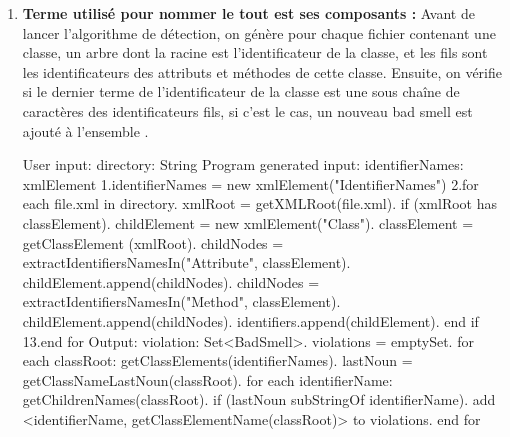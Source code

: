 \begin{enumerate}
\item \textbf {Terme utilisé pour nommer le tout est ses composants :}
Avant de lancer l'algorithme de détection, on génère pour chaque fichier contenant une classe, un arbre dont la racine est l'identificateur de la classe, et les fils sont les identificateurs des attributs et méthodes de cette classe.
Ensuite, on vérifie si le dernier terme de l'identificateur de la classe est une sous chaîne de caractères des identificateurs fils, si c'est le cas, un nouveau bad smell est ajouté à l'ensemble \cite{abebe2009lexicon}.
\begin{framed}
  {\selectfont  
User input:\newline
 directory: String\newline
 Program generated input:\newline
 identifierNames: xmlElement\newline
 1.identifierNames = new xmlElement("IdentifierNames")\newline
 2.for each file.xml in directory.	xmlRoot = getXMLRoot(file.xml).	if (xmlRoot has classElement).		childElement = new xmlElement("Class").             classElement = getClassElement (xmlRoot).		childNodes = extractIdentifiersNamesIn("Attribute", classElement).		childElement.append(childNodes).             childNodes = extractIdentifiersNamesIn("Method", classElement).		childElement.append(childNodes).		identifiers.append(childElement).	end if\newline
 13.end for\newline
 Output:\newline
 violation: Set<BadSmell>. violations = emptySet. for each classRoot: getClassElements(identifierNames).     lastNoun = getClassNameLastNoun(classRoot).     for each identifierName: getChildrenNames(classRoot).	    if (lastNoun subStringOf identifierName).	       add <identifierName, getClassElementName(classRoot)> to violations. end for\newline
}
\end{framed}


\end{enumerate}
